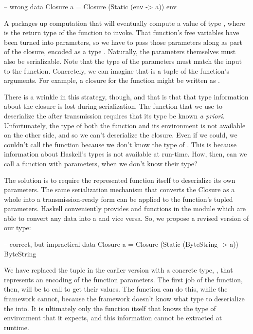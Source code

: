\documentclass[preprint]{sigplanconf}
\begin{document}
\begin{code}
-- wrong
data Closure a = Closure (Static (env -> a)) env
\end{code}

A  packages up computation that will eventually compute a value of type , where  is the return type of the function to invoke. That function's free variables have been turned into parameters, so we have to pass those parameters along as part of the closure, encoded as a type . Naturally, the parameters themselves must also be serializable. Note that the type of the parameters must match the input to the function. Concretely, we can imagine that  is a tuple of the function's arguments. For example, a closure for the  function might be written as .

There is a wrinkle in this strategy, though, and that is that that type information about the closure is lost during serialization. The  function that we use to deserialize the  after transmission requires that its type be known {\em a priori}. Unfortunately, the type of both the function and its environment is not available on the other side, and so we can't deserialize the closure. Even if we could, we couldn't call the function because we don't know the type of . This is because information about Haskell's types is not available at run-time. How, then, can we call a function with parameters, when we don't know their type?

The solution is to require the represented function itself to deserialize its own parameters. The same serialization mechanism that converts the Closure as a whole into a transmission-ready form can be applied to the function's tupled parameters. Haskell conveniently provides  and  functions in the  module which are able to convert any  data into a  and vice versa. So, we propose a revised version of our  type:

\begin{code}
-- correct, but impractical
data Closure a = Closure (Static (ByteString -> a)) ByteString
\end{code}

We have replaced the tuple  in the earlier version with a concrete type, , that represents an encoding of the function parameters. The first job of the function, then, will be to call  to get their values. The function can do this, while the framework cannot, because the framework doesn't know what type to deserialize the  into. It is ultimately only the function itself that knows the type of environment that it expects, and this information cannot be extracted at runtime.
\end{document}
